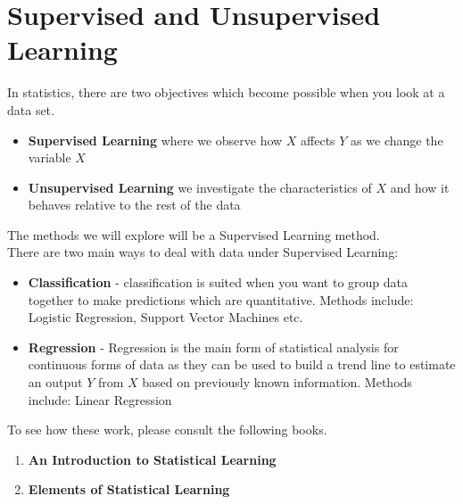 \documentclass[11pt,a4paper]{report}
\begin{document}
\section{Supervised and Unsupervised Learning}
In statistics, there are two objectives which become possible when you look at a data set.

\begin{itemize}
  \item \textbf{Supervised Learning} where we observe how $X$ affects $Y$ as we change the variable $X$
  
  \item \textbf{Unsupervised Learning} we investigate the characteristics of $X$ and how it behaves relative to the rest of the data
\end{itemize}
The methods we will explore will be a Supervised Learning method.\\
There are two main ways to deal with data under Supervised Learning:
\begin{itemize}
    \item \textbf{Classification} - classification is suited when you want to group data together to make predictions which are quantitative. 
    Methods include: Logistic Regression, Support Vector Machines etc.
    
    \item \textbf{Regression} - Regression is the main form of statistical analysis for continuous forms of data as they can be used to build a trend line to estimate an output $Y$ from $X$ based on previously known information.
    Methods include: Linear Regression
\end{itemize}
To see how these work, please consult the following books.
\begin{enumerate}
    \item \textbf{An Introduction to Statistical Learning} \cite[Chapter 3-4]{ISLR} 
    
    \item \textbf{Elements of Statistical Learning} \cite[Chapter 3-4]{ESL}
\end{enumerate}
\end{document}
